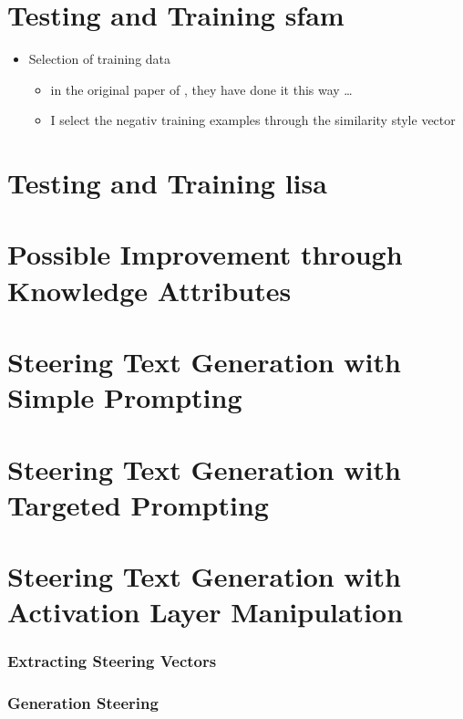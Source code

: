 \section{Testing and Training \acs{sfam}}
\label{sec:approach:sfam}

\begin{itemize}
  \item Selection of training data
        \begin{itemize}
          \item in the original paper of \textcite{patelLearningInterpretableStyle2023}, they have done it this way \ldots
          \item I select the negativ training examples through the similarity style vector
        \end{itemize}
\end{itemize}


\section{Testing and Training \acs{lisa}}
\label{sec:approach:lisa}


\section{Possible Improvement through Knowledge Attributes}
\label{sec:approach:knowledge_attributes}


\section{Steering Text Generation with Simple Prompting}
\label{sec:approach:steering:simple}


\section{Steering Text Generation with Targeted Prompting}
\label{sec:approach:steering:targeted}


\section{Steering Text Generation with Activation Layer Manipulation}
\label{sec:approach:steering:actAdd}

\subsubsection{Extracting Steering Vectors}

\subsubsection{Generation Steering}